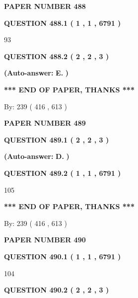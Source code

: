 \documentclass[12pt]{article}
\begin{document}
   
\newpage 
\setcounter{page}{ 
   488001 } 
   
   
 {\textbf{ \Large{ PAPER NUMBER  488  }}}
   
   
   
   
  
  
{\textbf{\large{QUESTION
488.1 
 ( 1 , 1 , 6791 )
}}}

93
  
  
{\textbf{\large{QUESTION
488.2 
 ( 2 , 2 , 3 )
}}}
 
 
{\textbf{(Auto-answer:}}
{\textbf{\large{
E.}}}
{\textbf{)}}
 
 
   
   
   
   
\vspace{1.0in} 
{\textbf{\large{ *** END OF PAPER, THANKS *** }}} 
   
   
\hspace{1.0in} By: 
 239 ( 416 ,  613 )
   
   
   
   
\newpage 
\setcounter{page}{ 
   489001 } 
   
   
 {\textbf{ \Large{ PAPER NUMBER  489  }}}
   
   
   
   
  
  
{\textbf{\large{QUESTION
489.1 
 ( 2 , 2 , 3 )
}}}
 
 
{\textbf{(Auto-answer:}}
{\textbf{\large{
D.}}}
{\textbf{)}}
 
 
  
  
{\textbf{\large{QUESTION
489.2 
 ( 1 , 1 , 6791 )
}}}

105
   
   
   
   
\vspace{1.0in} 
{\textbf{\large{ *** END OF PAPER, THANKS *** }}} 
   
   
\hspace{1.0in} By: 
 239 ( 416 ,  613 )
   
   
   
   
\newpage 
\setcounter{page}{ 
   490001 } 
   
   
 {\textbf{ \Large{ PAPER NUMBER  490  }}}
   
   
   
   
  
  
{\textbf{\large{QUESTION
490.1 
 ( 1 , 1 , 6791 )
}}}

104
  
  
{\textbf{\large{QUESTION
490.2 
 ( 2 , 2 , 3 )
}}}
 
\end{document}
